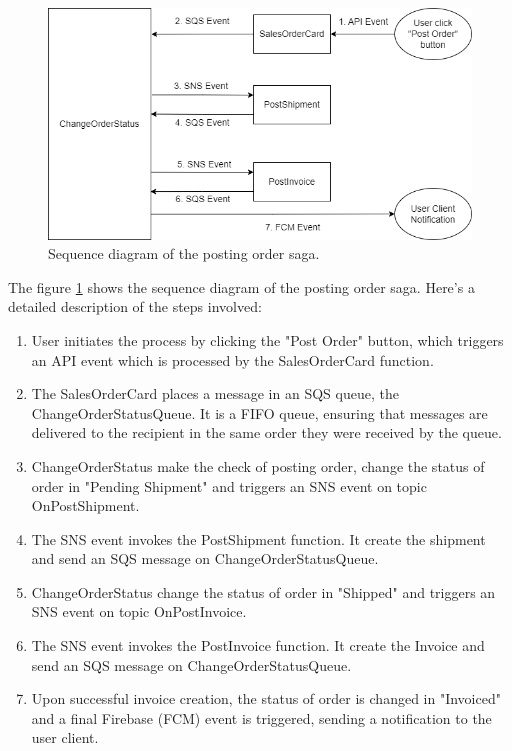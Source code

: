 \begin{figure}
    \centering
    \includegraphics[scale=0.6]{Pictures/5_saga.png}
    \caption{Sequence diagram of the posting order saga.}
    \label{fig:5_posting_order_saga}
\end{figure}

The figure \ref{fig:5_posting_order_saga} shows the sequence diagram of the posting order saga.
Here's a detailed description of the steps involved:
\begin{enumerate}
    \item User initiates the process by clicking the "Post Order" button, which triggers an API
          event which is processed by the SalesOrderCard function.
    \item The SalesOrderCard places a message in an SQS queue, the ChangeOrderStatusQueue. It is a
          FIFO queue, ensuring that messages are delivered to the recipient in the same order they were
          received by the queue.
    \item ChangeOrderStatus make the check of posting order, change the status of order in "Pending
          Shipment" and triggers an SNS event on topic OnPostShipment.
    \item The SNS event invokes the PostShipment function. It create the shipment and send an SQS
          message on ChangeOrderStatusQueue.
    \item ChangeOrderStatus change the status of order in "Shipped" and triggers an SNS event on topic OnPostInvoice.
    \item The SNS event invokes the PostInvoice function. It create the Invoice and send an SQS
          message on ChangeOrderStatusQueue.
    \item Upon successful invoice creation, the status of order is changed in "Invoiced" and a final
          Firebase (FCM) event is triggered, sending a notification to the user client.
\end{enumerate}

